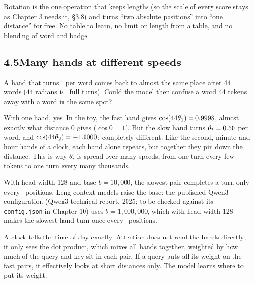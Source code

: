 \Why Rotation is the one operation that keeps lengths (so the scale of every score stays as Chapter 3
needs it, \S3.8) and turns ``two absolute positions'' into ``one distance'' for free. No table to learn, no
limit on length from a table, and no blending of word and badge.


\subsection*{4.5\quad Many hands at different speeds}

\Predict A hand that turns \nFourDegOne$^\circ$ per word comes back to almost the same place after 44 words
($44$ radians is \nFourWrapTurns\ full turns). Could the model then confuse a word 44 tokens away with a
word in the same spot?

With one hand, yes. In the toy, the fast hand gives $\cos(44\theta_1) = 0.9998$, almost exactly
what distance 0 gives ($\cos 0 = 1$). But the slow hand turns $\theta_2 = 0.50$ per word, and
$\cos(44\theta_2) = -1.0000$: completely different. Like the second, minute and hour hands of a
clock, each hand alone repeats, but together they pin down the distance. This is why $\theta_i$ is spread
over many speeds, from one turn every few tokens to one turn every many thousands.

\Exactly With head width 128 and base $b=10{,}000$, the slowest pair completes a turn only every
\nFourSlowWlTen\ positions. Long-context models raise the base: the published Qwen3 configuration
(Qwen3 technical report, 2025; to be checked against its \texttt{config.json} in Chapter 10) uses
$b=1{,}000{,}000$, which with head width 128 makes the slowest hand turn once every \nFourSlowWlMil\
positions.

\begin{breaks}
A clock tells the time of day exactly. Attention does not read the hands directly; it only sees the dot
product, which mixes all hands together, weighted by how much of the query and key sit in each pair. If a
query puts all its weight on the fast pairs, it effectively looks at short distances only. The model
learns where to put its weight.
\end{breaks}

